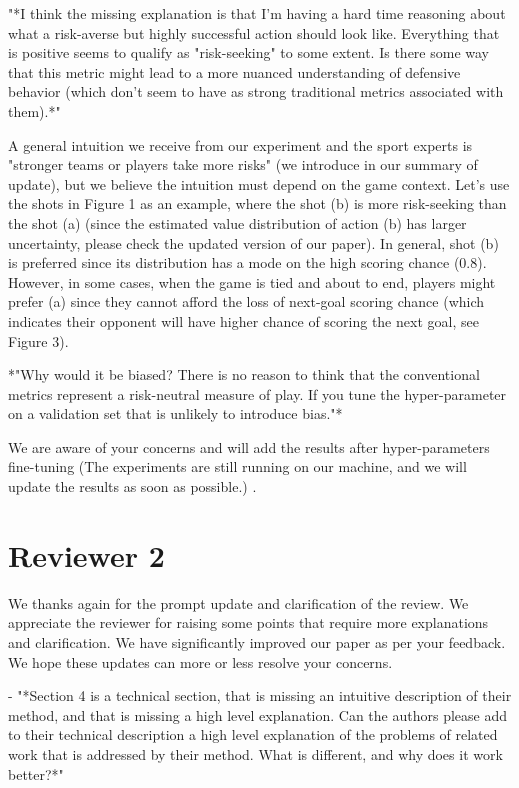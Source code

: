 \documentclass{article}
\begin{document}
"*I think the missing explanation is that I'm having a hard time reasoning about what a risk-averse but highly successful action should look like. Everything that is positive seems to qualify as "risk-seeking" to some extent. Is there some way that this metric might lead to a more nuanced understanding of defensive behavior (which don't seem to have as strong traditional metrics associated with them).*"

A general intuition we receive from our experiment and the sport experts is "stronger teams or players take more risks" (we introduce in our summary of update), but we believe the intuition must depend on the game context. 
Let's use the shots in Figure 1 as an example, where the shot (b) is more risk-seeking than the shot (a) (since the estimated value distribution of action (b) has larger uncertainty, please check the updated version of our paper). In general, shot (b) is preferred since its distribution has a mode on the high scoring chance (0.8). However, in some cases, when the game is tied and about to end, players might prefer (a) since they cannot afford the loss of next-goal scoring chance (which indicates their opponent will have higher chance of scoring the next goal, see Figure 3).


*"Why would it be biased? There is no reason to think that the conventional metrics represent a risk-neutral measure of play. If you tune the hyper-parameter on a validation set that is unlikely to introduce bias."*

We are aware of your concerns and will add the results after hyper-parameters fine-tuning (The experiments are still running on our machine, and we will update the results as soon as possible.) .


\section{Reviewer 2}

We thanks again for the prompt update and clarification of the review. We appreciate the reviewer for raising some points that require more explanations and clarification. We have significantly improved our paper as per your feedback. We hope these updates can more or less resolve your concerns.

- "*Section 4 is a technical section, that is missing an intuitive description of their method, and that is missing a high level explanation. Can the authors please add to their technical description a high level explanation of the problems of related work that is addressed by their method. What is different, and why does it work better?*"
\end{document}
